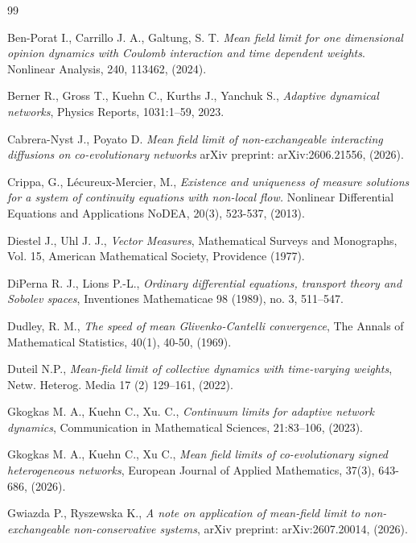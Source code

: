 \documentclass[10pt]{article}
\begin{document}
\begin{thebibliography}{99}
{ Ben-Porat I., Carrillo J. A.,  Galtung, S. T. \textit{Mean field limit for one dimensional opinion dynamics with Coulomb interaction and time dependent weights}. Nonlinear Analysis, 240, 113462, (2024).


 Berner R., Gross T.,  Kuehn C., Kurths J., Yanchuk S., \textit{ Adaptive dynamical networks}, Physics Reports, 1031:1–59, 2023. 

Cabrera-Nyst J.,  Poyato D. \textit{ Mean field limit of non-exchangeable interacting diffusions on co-evolutionary networks} arXiv preprint: arXiv:2606.21556, (2026).

Crippa, G.,  Lécureux-Mercier, M., \textit{  Existence and uniqueness of measure solutions for a system of continuity equations with non-local flow.} Nonlinear Differential Equations and Applications NoDEA, 20(3), 523-537, (2013).


Diestel J.,  Uhl J. J., \textit{ Vector Measures}, Mathematical Surveys and Monographs, Vol. 15, American Mathematical Society, Providence (1977).

  DiPerna R. J.,  Lions P.-L., \textit{ Ordinary differential equations, transport theory and Sobolev
spaces}, Inventiones Mathematicae 98 (1989), no. 3, 511–547.

 Dudley, R. M., \textit{ The speed of mean Glivenko-Cantelli convergence}, The Annals of Mathematical Statistics, 40(1), 40-50, (1969).


Duteil N.P., \textit{Mean-field limit of collective dynamics with time-varying weights}, Netw. Heterog. Media 17 (2) 129–161, (2022).


 Gkogkas M. A., Kuehn C., Xu. C., \textit{ Continuum limits for adaptive network dynamics}, 
Communication in Mathematical Sciences, 21:83–106, (2023).

Gkogkas M. A., Kuehn C.,  Xu C., \textit{  Mean field limits of co-evolutionary signed heterogeneous networks}, European Journal of Applied Mathematics, 37(3), 643-686, (2026).

 Gwiazda P., Ryszewska K., \textit{ A note on application of mean-field limit to non-exchangeable
non-conservative systems}, arXiv preprint:  	arXiv:2607.20014, (2026).

}
\end{thebibliography}
\end{document}
